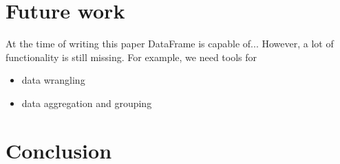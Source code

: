 \documentclass{article}
\begin{document}
\begin{multicols}{2}
%
%


%

\section{Future work}
At the time of writing this paper DataFrame is capable of...
However, a lot of functionality is still missing. For example, we need tools for
\begin{itemize}
  \item data wrangling
  \item data aggregation and grouping
\end{itemize}

\section{Conclusion}
\label{sec:conclusion}



%


% 
% 

% 




%
\end{multicols}
\end{document}
